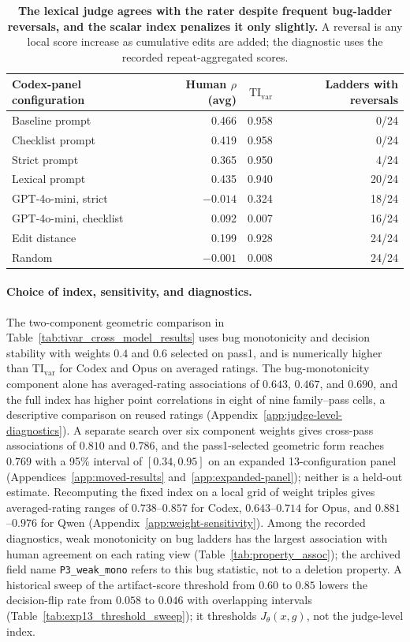 \begin{table}[htbp]
\centering\small
\begin{tabular}{@{}lrrr@{}}
\toprule
Codex-panel configuration & Human $\rho$ (avg) & $\mathrm{TI}_{\mathrm{var}}$ & Ladders with reversals \\
\midrule
Baseline prompt & 0.466 & 0.958 & 0/24 \\
Checklist prompt & 0.419 & 0.958 & 0/24 \\
Strict prompt & 0.365 & 0.950 & 4/24 \\
Lexical prompt & 0.435 & 0.940 & 20/24 \\
GPT-4o-mini, strict & $-0.014$ & 0.324 & 18/24 \\
GPT-4o-mini, checklist & 0.092 & 0.007 & 16/24 \\
Edit distance & 0.199 & 0.928 & 24/24 \\
Random & $-0.001$ & 0.008 & 24/24 \\
\bottomrule
\end{tabular}
\caption{\textbf{The lexical judge agrees with the rater despite frequent bug-ladder reversals, and the scalar index penalizes it only slightly.} A reversal is any local score increase as cumulative edits are added; the diagnostic uses the recorded repeat-aggregated scores.}
\label{tab:codex_configs}
\end{table}

\paragraph{Choice of index, sensitivity, and diagnostics.}
The two-component geometric comparison in Table~\ref{tab:tivar_cross_model_results} uses bug monotonicity and decision stability with weights $0.4$ and $0.6$ selected on pass1, and is numerically higher than $\mathrm{TI}_{\mathrm{var}}$ for Codex and Opus on averaged ratings.
The bug-monotonicity component alone has averaged-rating associations of $0.643$, $0.467$, and $0.690$, and the full index has higher point correlations in eight of nine family--pass cells, a descriptive comparison on reused ratings (Appendix~\ref{app:judge-level-diagnostics}).
A separate search over six component weights gives cross-pass associations of $0.810$ and $0.786$, and the pass1-selected geometric form reaches $0.769$ with a 95\% interval of $[0.34,0.95]$ on an expanded 13-configuration panel (Appendices~\ref{app:moved-results} and~\ref{app:expanded-panel}); neither is a held-out estimate.
Recomputing the fixed index on a local grid of weight triples gives averaged-rating ranges of $0.738$--$0.857$ for Codex, $0.643$--$0.714$ for Opus, and $0.881$--$0.976$ for Qwen (Appendix~\ref{app:weight-sensitivity}).
Among the recorded diagnostics, weak monotonicity on bug ladders has the largest association with human agreement on each rating view (Table~\ref{tab:property_assoc}); the archived field name \texttt{P3\_weak\_mono} refers to this bug statistic, not to a deletion property.
A historical sweep of the artifact-score threshold from $0.60$ to $0.85$ lowers the decision-flip rate from $0.058$ to $0.046$ with overlapping intervals (Table~\ref{tab:exp13_threshold_sweep}); it thresholds $J_\theta(x,g)$, not the judge-level index.

